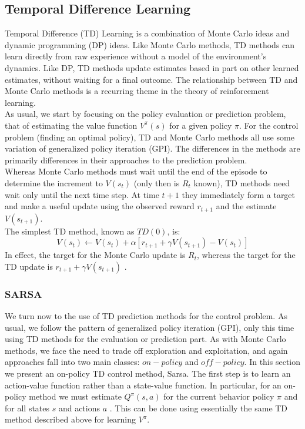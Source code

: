 \documentclass[11pt]{article}
\theoremstyle{plain}
\theoremstyle{definition}
\begin{document}
\subsection{Temporal Difference Learning}
Temporal Difference (TD) Learning is a combination of Monte Carlo ideas and dynamic programming (DP) ideas. Like Monte Carlo methods, TD methods can learn directly from raw experience without a model of the environment's dynamics. Like DP, TD methods update estimates based in part on other learned estimates, without waiting for a final outcome. The relationship between TD and Monte Carlo methods is a recurring theme in the theory of reinforcement learning.
\\
As usual, we start by focusing on the policy evaluation or prediction problem, that of estimating the value function  $V^\pi(s)$ for a given policy $\pi$. For the control problem (finding an optimal policy), TD and Monte Carlo methods all use some variation of generalized policy iteration (GPI). The differences in the methods are primarily differences in their approaches to the prediction problem.
\\
Whereas Monte Carlo methods must wait until the end of the episode to determine the increment to $V(s_t)$ (only then is $R_t$ known), TD methods need wait only until the next time step. At time $t+1$ they immediately form a target and make a useful update using the observed reward $r_{t+1}$ and the estimate $V(s_{t+1})$. \\
The simplest TD method, known as $TD(0)$, is:
\begin{equation}
V(s_t) \leftarrow V(s_t) + \alpha [r_{t+1}+\gamma V(s_{t+1})-V(s_t)]
\end{equation}
In effect, the target for the Monte Carlo update is $R_t$, whereas the target for the TD update is $r_{t+1}+\gamma V(s_{t+1})$ .
\newpage
\subsubsection{SARSA}
We turn now to the use of TD prediction methods for the control problem. As usual, we follow the pattern of generalized policy iteration (GPI), only this time using TD methods for the evaluation or prediction part. As with Monte Carlo methods, we face the need to trade off exploration and exploitation, and again approaches fall into two main classes: $on-policy$ and $off-policy$. In this section we present an on-policy TD control method, Sarsa.
The first step is to learn an action-value function rather than a state-value function. In particular, for an on-policy method we must estimate $Q^\pi (s,a)$  for the current behavior policy $\pi$  and for all states $s$  and actions $a$ . This can be done using essentially the same TD method described above for learning $V^\pi$.\\
\end{document}
